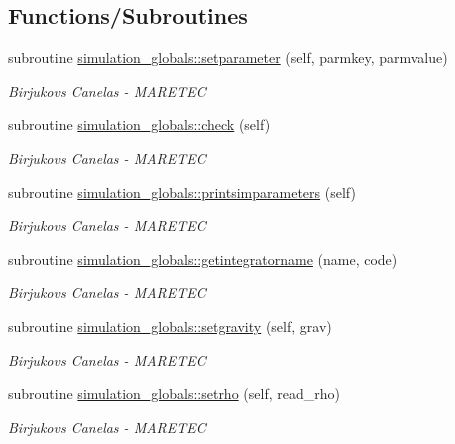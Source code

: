 \subsection*{Functions/\+Subroutines}
\begin{DoxyCompactItemize}
\item 
subroutine \mbox{\hyperlink{namespacesimulation__globals_aed3f671899558008ae9f0f009f581baf}{simulation\+\_\+globals\+::setparameter}} (self, parmkey, parmvalue)
\begin{DoxyCompactList}\small\item\em Birjukovs Canelas -\/ M\+A\+R\+E\+T\+EC \end{DoxyCompactList}\item 
subroutine \mbox{\hyperlink{namespacesimulation__globals_a3867df0f77dca3700c9470aea24fd048}{simulation\+\_\+globals\+::check}} (self)
\begin{DoxyCompactList}\small\item\em Birjukovs Canelas -\/ M\+A\+R\+E\+T\+EC \end{DoxyCompactList}\item 
subroutine \mbox{\hyperlink{namespacesimulation__globals_a0b17b2f2e9e7dbbad7c9d735217c1ee1}{simulation\+\_\+globals\+::printsimparameters}} (self)
\begin{DoxyCompactList}\small\item\em Birjukovs Canelas -\/ M\+A\+R\+E\+T\+EC \end{DoxyCompactList}\item 
subroutine \mbox{\hyperlink{namespacesimulation__globals_a2c6bf88542c503d1da58280ab3dcf772}{simulation\+\_\+globals\+::getintegratorname}} (name, code)
\begin{DoxyCompactList}\small\item\em Birjukovs Canelas -\/ M\+A\+R\+E\+T\+EC \end{DoxyCompactList}\item 
subroutine \mbox{\hyperlink{namespacesimulation__globals_ac655f60155581a71b312f3c1a8c87db2}{simulation\+\_\+globals\+::setgravity}} (self, grav)
\begin{DoxyCompactList}\small\item\em Birjukovs Canelas -\/ M\+A\+R\+E\+T\+EC \end{DoxyCompactList}\item 
subroutine \mbox{\hyperlink{namespacesimulation__globals_acfdc640757f0275bccb1d8de7bd7dc92}{simulation\+\_\+globals\+::setrho}} (self, read\+\_\+rho)
\begin{DoxyCompactList}\small\item\em Birjukovs Canelas -\/ M\+A\+R\+E\+T\+EC \end{DoxyCompactList}\item 

\end{DoxyCompactItemize}
